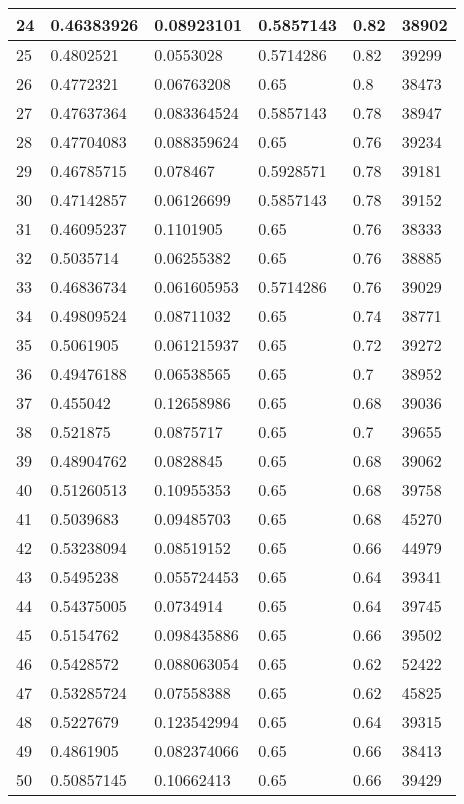 \begin{longtable}{|l|l|l|l|l|l|}
24 & 0.46383926 & 0.08923101 & 0.5857143 & 0.82 & 38902 \\ \hline 
25 & 0.4802521 & 0.0553028 & 0.5714286 & 0.82 & 39299 \\ \hline 
26 & 0.4772321 & 0.06763208 & 0.65 & 0.8 & 38473 \\ \hline 
27 & 0.47637364 & 0.083364524 & 0.5857143 & 0.78 & 38947 \\ \hline 
28 & 0.47704083 & 0.088359624 & 0.65 & 0.76 & 39234 \\ \hline 
29 & 0.46785715 & 0.078467 & 0.5928571 & 0.78 & 39181 \\ \hline 
30 & 0.47142857 & 0.06126699 & 0.5857143 & 0.78 & 39152 \\ \hline 
31 & 0.46095237 & 0.1101905 & 0.65 & 0.76 & 38333 \\ \hline 
32 & 0.5035714 & 0.06255382 & 0.65 & 0.76 & 38885 \\ \hline 
33 & 0.46836734 & 0.061605953 & 0.5714286 & 0.76 & 39029 \\ \hline 
34 & 0.49809524 & 0.08711032 & 0.65 & 0.74 & 38771 \\ \hline 
35 & 0.5061905 & 0.061215937 & 0.65 & 0.72 & 39272 \\ \hline 
36 & 0.49476188 & 0.06538565 & 0.65 & 0.7 & 38952 \\ \hline 
37 & 0.455042 & 0.12658986 & 0.65 & 0.68 & 39036 \\ \hline 
38 & 0.521875 & 0.0875717 & 0.65 & 0.7 & 39655 \\ \hline 
39 & 0.48904762 & 0.0828845 & 0.65 & 0.68 & 39062 \\ \hline 
40 & 0.51260513 & 0.10955353 & 0.65 & 0.68 & 39758 \\ \hline 
41 & 0.5039683 & 0.09485703 & 0.65 & 0.68 & 45270 \\ \hline 
42 & 0.53238094 & 0.08519152 & 0.65 & 0.66 & 44979 \\ \hline 
43 & 0.5495238 & 0.055724453 & 0.65 & 0.64 & 39341 \\ \hline 
44 & 0.54375005 & 0.0734914 & 0.65 & 0.64 & 39745 \\ \hline 
45 & 0.5154762 & 0.098435886 & 0.65 & 0.66 & 39502 \\ \hline 
46 & 0.5428572 & 0.088063054 & 0.65 & 0.62 & 52422 \\ \hline 
47 & 0.53285724 & 0.07558388 & 0.65 & 0.62 & 45825 \\ \hline 
48 & 0.5227679 & 0.123542994 & 0.65 & 0.64 & 39315 \\ \hline 
49 & 0.4861905 & 0.082374066 & 0.65 & 0.66 & 38413 \\ \hline 
50 & 0.50857145 & 0.10662413 & 0.65 & 0.66 & 39429 \\ \hline 
\end{longtable}